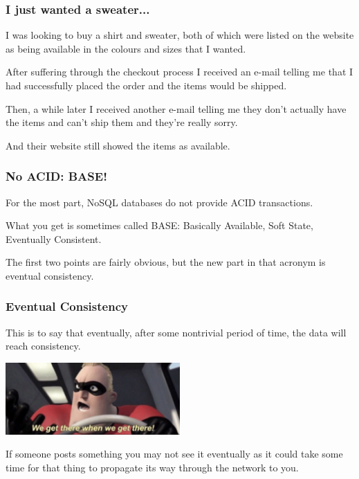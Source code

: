 \begin{frame}
\frametitle{I just wanted a sweater...}

I was looking to buy a shirt and sweater, both of which were listed on the website as being available in the colours and sizes that I wanted. 

After suffering through the checkout process I received an e-mail telling me that I had successfully placed the order and the items would be shipped. 

Then, a while later I received another e-mail telling me they don't actually have the items and can't ship them and they're really sorry. 

And their website still showed the items as available. 

\end{frame}



\begin{frame}
\frametitle{No ACID: BASE!}

For the most part, NoSQL databases do not provide ACID transactions. 

What you get is sometimes called BASE: Basically Available, Soft State, Eventually Consistent. 

The first two points are fairly obvious, but the new part in that acronym is \alert{eventual consistency}.

\end{frame}



\begin{frame}
\frametitle{Eventual Consistency}

This is to say that eventually, after some nontrivial period of time, the data will reach consistency. 

\begin{center}
	\includegraphics[width=0.5\textwidth]{images/eventually.png}
\end{center}

If someone posts something you may not see it eventually as it could take some time for that thing to propagate its way through the network to you. 

\end{frame}



